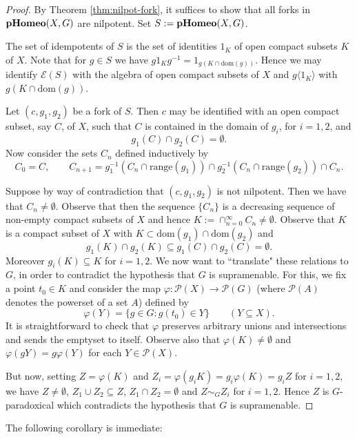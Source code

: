 \documentclass[11pt]{amsart}
\theoremstyle{plain}            %
\theoremstyle{definition}       %
\theoremstyle{definition}       %
\theoremstyle{remark}
\newcommand{\pHomeo}{\mathrm{\bf pHomeo}}
\begin{document}
\begin{proof}
	By Theorem \ref{thm:nilpot-fork}, it suffices to show that all forks in $\pHomeo (X,G)$ are nilpotent. Set $S:= \pHomeo (X,G)$. 
	
	The set of idempotents of $S$ is the set of identities $1_K$ of open compact subsets $K$ of $X$.
	Note that for $g\in S$ we have $g1_Kg^{-1} = 1_{g(K\cap \text{dom} (g))}$. Hence we may identify $\mathcal E (S)$ with the algebra of open compact subsets of $X$ and $g\langle 1_K \rangle$ with 
	$g(K\cap \text{dom} (g))$.   
	
	Let $(c,g_1,g_2)$ be a fork of $S$. Then $c$ may be identified with an open compact subset, say $C$, of $X$, such that $C$ is contained in the domain of $g_i$, for $i=1,2$, and 
	$$g_1(C) \cap g_2(C) =\emptyset.$$  
	Now consider the sets $C_n$ defined inductively by 
	$$C_0= C, \qquad C_{n+1} = g_1^{-1}(C_n\cap \text{range} (g_1))\cap g_2^{-1}(C_n\cap \text{range} (g_2)) \cap C_n.$$
	
	Suppose by way of contradiction that $(c,g_1,g_2)$ is not nilpotent. Then we have that $C_n\ne \emptyset$. Observe that then the sequence $\{C_n\}$ is a decreasing sequence of non-empty compact subsets of $X$ and hence $K:= \cap_{n=0}^{\infty} C_n \ne \emptyset$.  Observe that $K$ is a compact subset of $X$ with $K\subset \text{dom}(g_1)\cap \text{dom} (g_2)$ and
	$$g_1(K)\cap g_2(K) \subseteq g_1(C)\cap g_2 (C) =  \emptyset.$$
	Moreover $g_i(K) \subseteq K$ for $i=1,2$. 
	We now want to ``translate" these relations to $G$, in order to contradict the hypothesis that $G$ is supramenable. For this, we fix a point $t_0\in K$ and consider the map
	$\varphi \colon \mathcal P (X) \to \mathcal P (G)$  (where $\mathcal P (A)$ denotes the powerset of a set  $A$) defined by
	$$\varphi (Y) = \{ g\in G : g(t_0)\in Y \} \qquad (Y\subseteq X).$$
	It is straightforward to check that $\varphi$ preserves arbitrary unions and intersections and sends the emptyset to itself. Observe also that $\varphi (K)\ne \emptyset$ and $\varphi (gY)= g\varphi (Y)$ for each $Y\in \mathcal P (X)$. 
	
	But now, setting $Z= \varphi (K)$ and $Z_i= \varphi (g_iK)= g_i \varphi (K)= g_iZ$ for $i=1,2$, we have   $Z\ne \emptyset $, $Z_1\cup Z_2 \subseteq Z$, $Z_1\cap Z_2 = \emptyset$ and $Z\sim_G Z_i$ for $i=1,2$. Hence $Z$ is $G$-paradoxical which contradicts the hypothesis that $G$ is supramenable.
\end{proof}


The following corollary is immediate:
\end{document}
